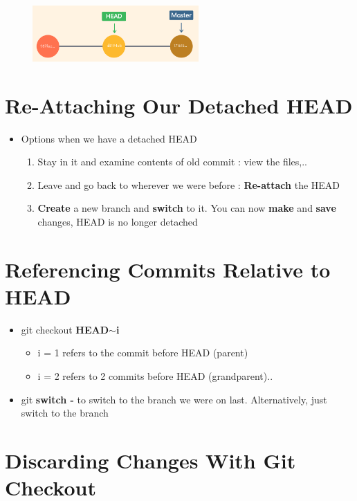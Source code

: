 \documentclass{report}
\begin{document}
\begin{figure}[H] 
	 \centering 
	 \includegraphics[width=2.5in]{screenshots/2022-07-06T18-51-35Z.png} 
 \end{figure}


\section{Re-Attaching Our Detached HEAD}

\begin{itemize}
	\item Options when we have a detached HEAD
		\begin{enumerate}
			\item Stay in it and examine contents of old commit : view the files,.. 
			\item Leave and go back to wherever we were before : \textbf{Re-attach} the HEAD 
			\item \textbf{Create} a new branch and \textbf{switch} to it. You can now \textbf{make} and \textbf{save} changes, HEAD is no longer detached
		\end{enumerate}
\end{itemize}


\section{Referencing Commits Relative to HEAD}

\begin{itemize}
	\item git checkout \textbf{HEAD$ \sim $i}
		\begin{itemize}
			\item i = 1 refers to the commit before HEAD (parent)
			\item i = 2 refers to 2 commits before HEAD (grandparent)..
		\end{itemize}
	\item git \textbf{switch -} to switch to the branch we were on last. Alternatively, just switch to the branch 
\end{itemize}


\section{Discarding Changes With Git Checkout}
\end{document}
